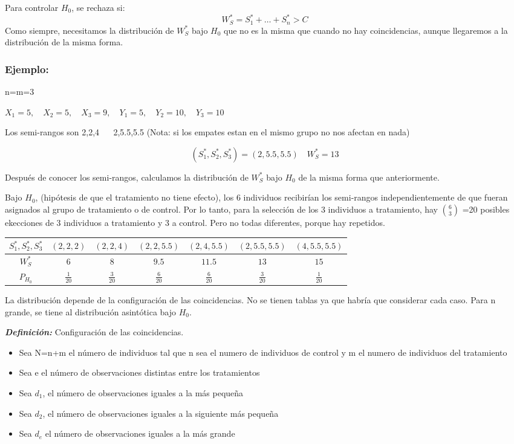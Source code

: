  Para controlar $H_0$, se rechaza si:
 \[
 W_S^*=S_1^*+\dots+S_n^*>C
 \]
Como siempre, necesitamos la distribución de $W_S^*$ bajo $H_0$ que no es la misma que cuando no hay coincidencias, aunque llegaremos a la distribución de la misma forma.
\subsubsection*{Ejemplo:}
n=m=3

\(
X_1=5, \quad X_2=5, \quad X_3=9, \quad Y_1=5,\quad Y_2=10,\quad Y_3=10
\)

Los semi-rangos son 2,2,4 $\quad$ 2,5.5,5.5
(Nota: si los empates estan en el mismo grupo no nos afectan en nada)

\[
(S_1^*,S_2^*,S_3^*)=(2,5.5,5.5) \quad W_S^*=13
\]

Después de conocer los semi-rangos, calculamos la distribución de $W_S^*$ bajo $H_0$ de la misma forma que anteriormente.

Bajo $H_0$, (hipótesis de que el tratamiento no tiene efecto), los 6 individuos recibirían los semi-rangos independientemente de que fueran asignados al grupo de tratamiento o de control. Por lo tanto, para la selección de los 3 individuos a tratamiento, hay $\binom{6}{3}$
=20 posibles ekecciones de 3 individuos a tratamiento y 3 a control. Pero no todas diferentes, porque hay repetidos.

\begin{table}[h!]
    \centering
    \begin{tabular}{c|c|c|c|c|c|c}
    $S_1^*,S_2^*,S_3^*$ & $(2,2,2)$ & $(2,2,4)$ & $(2,2,5.5)$ & $(2,4,5.5)$ & $(2,5.5,5.5)$ & $(4,5.5,5.5)$ \\ \hline
    $W_S^*$             & $6$       & $8$       & $9.5$       & $11.5$      & $13$          & $15$          \\ \hline
    $P_{H_0}$           & $\frac{1}{20}$ & $\frac{3}{20}$ & $\frac{6}{20}$ & $\frac{6}{20}$ & $\frac{3}{20}$ & $\frac{1}{20}$
    \end{tabular}
\end{table}


La distribución depende de la configuración de las coincidencias. No se tienen tablas ya que habría que considerar cada caso.
Para n grande, se tiene al distribución asintótica bajo $H_0$.

\textit{\textbf{Definición: }}Configuración de las coincidencias. 
\begin{itemize}
    \item Sea N=n+m el número de individuos tal que n sea el numero de individuos de control y m el numero de individuos del tratamiento
    \item Sea e el número de observaciones distintas entre los tratamientos
    \item Sea $d_1$, el número de observaciones iguales a la más pequeña
    \item Sea $d_2$, el número de observaciones iguales a la siguiente más pequeña
    \item Sea $d_e$ el número de observaciones iguales a la más grande
\end{itemize}

